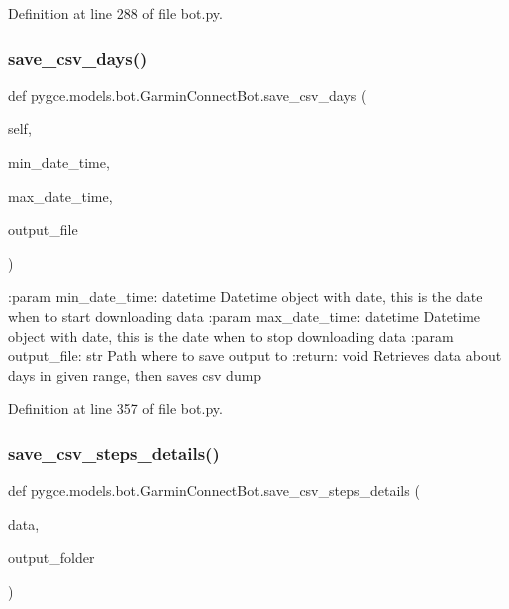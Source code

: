 Definition at line 288 of file bot.\+py.

\mbox{\label{classpygce_1_1models_1_1bot_1_1_garmin_connect_bot_ac10284acc765724afd060381ace0cb5e}} 
\subsubsection{\texorpdfstring{save\+\_\+csv\+\_\+days()}{save\_csv\_days()}}
{\footnotesize\ttfamily def pygce.\+models.\+bot.\+Garmin\+Connect\+Bot.\+save\+\_\+csv\+\_\+days (\begin{DoxyParamCaption}\item[{}]{self,  }\item[{}]{min\+\_\+date\+\_\+time,  }\item[{}]{max\+\_\+date\+\_\+time,  }\item[{}]{output\+\_\+file }\end{DoxyParamCaption})}

\begin{DoxyVerb}:param min_date_time: datetime
    Datetime object with date, this is the date when to start downloading data
:param max_date_time: datetime
    Datetime object with date, this is the date when to stop downloading data
:param output_file: str
    Path where to save output to
:return: void
    Retrieves data about days in given range, then saves csv dump
\end{DoxyVerb}
 

Definition at line 357 of file bot.\+py.

\mbox{\label{classpygce_1_1models_1_1bot_1_1_garmin_connect_bot_a7a3affbcf44b0b4a2d82a3dc517d41bc}} 
\subsubsection{\texorpdfstring{save\+\_\+csv\+\_\+steps\+\_\+details()}{save\_csv\_steps\_details()}}
{\footnotesize\ttfamily def pygce.\+models.\+bot.\+Garmin\+Connect\+Bot.\+save\+\_\+csv\+\_\+steps\+\_\+details (\begin{DoxyParamCaption}\item[{}]{data,  }\item[{}]{output\+\_\+folder }\end{DoxyParamCaption})\hspace{0.3cm}{\ttfamily [static]}}



